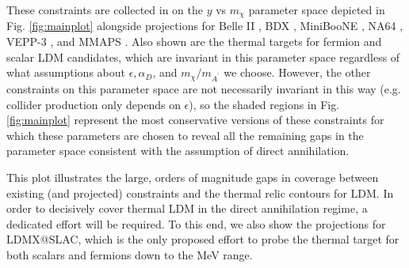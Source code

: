 \documentclass{article}
\begin{document}
These constraints are collected in on the $y$ vs $m_\chi$ parameter space depicted in Fig. \ref{fig:mainplot}  alongside projections
for Belle II \cite{Essig:2013vha}, BDX \cite{Izaguirre:2013uxa,Battaglieri:2016ggd}, MiniBooNE \cite{Dharmapalan:2012xp}, NA64 \cite{Gninenko:2016kpg}, VEPP-3 \cite{Wojtsekhowski:2012zq}, and MMAPS \cite{cornell}.
Also shown are the thermal targets for fermion and scalar LDM candidates, which are invariant in this parameter space regardless
of what assumptions about $\epsilon, \alpha_D$, and $m_\chi/m_{A^\prime}$ we choose. However, the other constraints on this 
parameter space are not necessarily invariant in this way (e.g. collider production only depends on $\epsilon$), so the 
shaded regions in Fig. \ref{fig:mainplot} represent the most conservative versions of these constraints for which
 these parameters are chosen to reveal all the remaining gaps in the parameter space consistent with the assumption of 
 direct annihilation. 
 
 This plot illustrates the large, orders of magnitude gaps in coverage between existing (and projected) constraints
 and the thermal relic contours for LDM. In order to decisively cover thermal LDM in the direct annihilation regime, a dedicated effort will
 be required. To this end, we also show the projections for LDMX@SLAC, which is the only proposed effort to probe the thermal
 target for both scalars and fermions down to the MeV range. 


\end{document}
